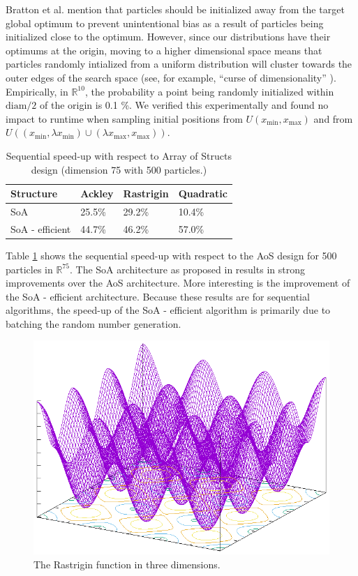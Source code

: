 Bratton et al. \cite{spso} mention that particles should be initialized away
from the target global optimum to prevent unintentional bias as a result of
particles being initialized close to the optimum. However, since our
distributions have their optimums at the origin, moving to a higher dimensional
space means that particles randomly intialized from a uniform distribution will
cluster towards the outer edges of the search space (see, for example, ``curse
of dimensionality'' \cite{hastie}). Empirically, in $\mathbb{R}^{10}$, the
probability a point being randomly initialized within $\text{diam}/2$ of the origin is 0.1 \%.
We verified this experimentally and found no
impact to runtime when sampling initial positions from $U(x_{\min}, x_{\max})$
and from $U((x_{\min},\lambda x_{\min})\cup(\lambda x_{\max}, x_{\max}))$.

\begin{table}
  \centering
  \caption{Sequential speed-up with respect to Array of Structs design (dimension
    75 with 500 particles.)}
  \label{tab:seq-baseline}
\begin{tabular}{llll}\toprule
Structure       & Ackley & Rastrigin & Quadratic \\\midrule
SoA             & 25.5\%  & 29.2\%     & 10.4\%     \\
SoA - efficient & 44.7\%  & 46.2\%     & 57.0\%     \\\bottomrule
\end{tabular}
\end{table}

Table \ref{tab:seq-baseline} shows the sequential speed-up with respect to the
AoS design for 500 particles in $\mathbb{R}^{75}$. The SoA architecture as
proposed in \cite{cache-pso} results in strong improvements over the AoS
architecture. More interesting is the improvement of the SoA - efficient
architecture. Because these results are for sequential algorithms, the speed-up
of the SoA - efficient algorithm is primarily due to batching the random number
generation.


\begin{figure}
  \includegraphics[width=\columnwidth]{../img/output/rastrigin}
  \caption{The Rastrigin function in three dimensions.}\label{fig:rastrigin}
\end{figure}

